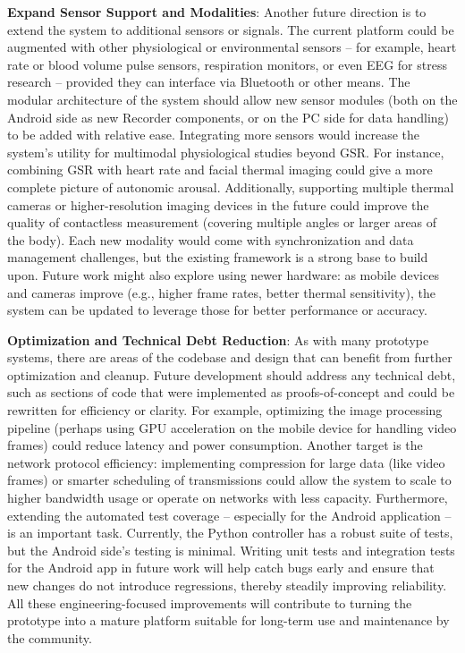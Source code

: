 \textbf{Expand Sensor Support and Modalities}: Another future direction is to extend the system to additional sensors or signals. The current platform could be augmented with other physiological or environmental sensors -- for example, heart rate or blood volume pulse sensors, respiration monitors, or even EEG for stress research -- provided they can interface via Bluetooth or other means. The modular architecture of the system should allow new sensor modules (both on the Android side as new Recorder components, or on the PC side for data handling) to be added with relative ease. Integrating more sensors would increase the system's utility for multimodal physiological studies beyond GSR. For instance, combining GSR with heart rate and facial thermal imaging could give a more complete picture of autonomic arousal. Additionally, supporting multiple thermal cameras or higher-resolution imaging devices in the future could improve the quality of contactless measurement (covering multiple angles or larger areas of the body). Each new modality would come with synchronization and data management challenges, but the existing framework is a strong base to build upon. Future work might also explore using newer hardware: as mobile devices and cameras improve (e.g., higher frame rates, better thermal sensitivity), the system can be updated to leverage those for better performance or accuracy.

\textbf{Optimization and Technical Debt Reduction}: As with many prototype systems, there are areas of the codebase and design that can benefit from further optimization and cleanup. Future development should address any technical debt, such as sections of code that were implemented as proofs-of-concept and could be rewritten for efficiency or clarity. For example, optimizing the image processing pipeline (perhaps using GPU acceleration on the mobile device for handling video frames) could reduce latency and power consumption. Another target is the network protocol efficiency: implementing compression for large data (like video frames) or smarter scheduling of transmissions could allow the system to scale to higher bandwidth usage or operate on networks with less capacity. Furthermore, extending the automated test coverage -- especially for the Android application -- is an important task. Currently, the Python controller has a robust suite of tests, but the Android side's testing is minimal. Writing unit tests and integration tests for the Android app in future work will help catch bugs early and ensure that new changes do not introduce regressions, thereby steadily improving reliability. All these engineering-focused improvements will contribute to turning the prototype into a mature platform suitable for long-term use and maintenance by the community.

